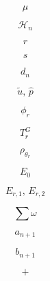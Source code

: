 \[\mu\]

\[\mathcal{H}_n\]

\[r\]

\[s\]

\[d_n\]

\[\tilde{u},\,\hat{p}\]

\[\phi_r\]

\[T_r^G\]

\[\rho_{\theta_r}\]

\[E_0\]

\[E_{r,1},\,E_{r,2}\]

\[\sum\omega\]

\[a_{n+1}\]

\[b_{n+1}\]

\[+\]
